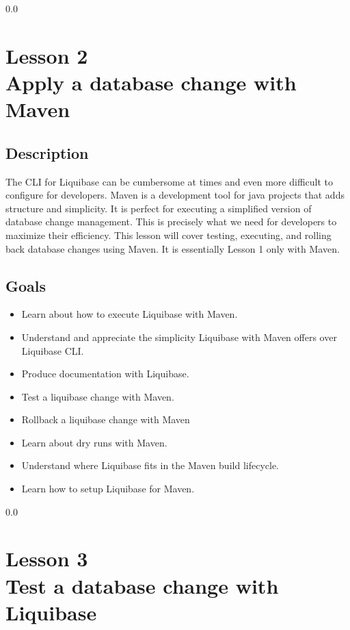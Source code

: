 {\setlength{\baselineskip}%
  {0.0\baselineskip}
  \section*{\flushright Lesson 2\\
  Apply a database change with Maven}
  \hrulefill \par}

\subsection*{Description}
The CLI for Liquibase can be cumbersome at times and even more
difficult to configure for developers. Maven is a development tool for
java projects that adds structure and simplicity. It is perfect for
executing a simplified version of database change management. This is
precisely what we need for developers to maximize their
efficiency. This lesson will cover testing, executing, and rolling back
database changes using Maven. It is essentially Lesson 1 only with Maven.


\subsection*{Goals}
\begin{itemize}
  \item Learn about how to execute Liquibase with Maven.
  \item Understand and appreciate the simplicity Liquibase with Maven
    offers over Liquibase CLI.
  \item Produce documentation with Liquibase.
  \item Test a liquibase change with Maven.
  \item Rollback a liquibase change with Maven
  \item Learn about dry runs with Maven.
  \item Understand where Liquibase fits in the Maven build lifecycle.
  \item Learn how to setup Liquibase for Maven.
\end{itemize}

{\setlength{\baselineskip}%
  {0.0\baselineskip}
  \section*{\flushright Lesson 3\\
  Test a database change with Liquibase}
  \hrulefill \par}

